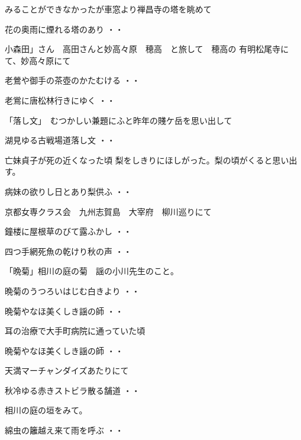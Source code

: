 \documentclass[b5paper]{tbook}
\begin{document}
みることができなかったが車窓より禅昌寺の塔を眺めて
\begin{shiika}花の奥雨に煙れる塔のあり
\hfill{・・}\end{shiika}
\vspace{0.6cm}
小森田」さん　高田さんと妙高々原　穂高　と旅して　穂高の
有明松尾寺にて、妙高々原にて
\begin{shiika}老鶯や御手の茶壺のかたむける
\hfill{・・}\end{shiika}
\begin{shiika}老鴬に唐松林行きにゆく
\hfill{・・}\end{shiika}
「落し文」　むつかしい兼題にふと昨年の賤ケ岳を思い出して
\begin{shiika}湖見ゆる古戦場道落し文
\hfill{・・}\end{shiika}
\vspace{0.6cm}
亡妹貞子が死の近くなった頃
梨をしきりにほしがった。梨の頃がくると思い出す。
\begin{shiika}病妹の欲りし日とあり梨供ふ
\hfill{・・}\end{shiika}
\vspace{0.6cm}
京都女専クラス会　九州志賀島　大宰府　柳川巡りにて
\begin{shiika}鐘楼に屋根草のびて露ふかし
\hfill{・・}\end{shiika}
\begin{shiika}四つ手網死魚の乾けり秋の声
\hfill{・・}\end{shiika}
\vspace{0.6cm}
「晩菊」相川の庭の菊　謡の小川先生のこと。
\begin{shiika}晩菊のうつろいはじむ白きより
\hfill{・・}\end{shiika}
\begin{shiika}晩菊やなほ美くしき謡の師
\hfill{・・}\end{shiika}
\vspace{0.6cm}
耳の治療で大手町病院に通っていた頃
\begin{shiika}晩菊やなほ美くしき謡の師
\hfill{・・}\end{shiika}
\vspace{0.6cm}
天満マーチャンダイズあたりにて
\begin{shiika}秋冷ゆる赤きストビラ散る舗道
\hfill{・・}\end{shiika}
\vspace{0.6cm}
相川の庭の垣をみて。
\begin{shiika}綿虫の籬越え来て雨を呼ぶ
\hfill{・・}\end{shiika}
\vspace{0.6cm}
\end{document}
